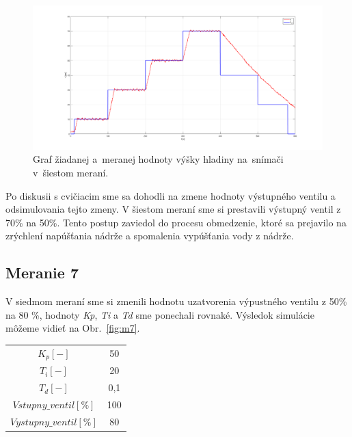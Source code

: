 \documentclass{article}
\begin{document}
\begin{figure}[!htbp]
	\begin{center}
		\includegraphics[width=\textwidth]{./include/meranie6.png}
	\end{center}
	\caption{Graf žiadanej a~meranej hodnoty výšky hladiny na~snímači v~šiestom meraní.}
	\label{fig:m6}
\end{figure}

Po diskusii s cvičiacim sme sa dohodli na zmene hodnoty výstupného ventilu a odsimulovania tejto zmeny.
V šiestom meraní sme si prestavili výstupný ventil z 70\% na 50\%. Tento postup zaviedol do procesu
obmedzenie, ktoré sa prejavilo na zrýchlení napúšťania nádrže a spomalenia vypúšťania vody z nádrže.

\clearpage

\subsection{Meranie 7}
\label{sec:meranie7}

V siedmom meraní sme si zmenili hodnotu uzatvorenia výpustného ventilu z 50\% na 80 \%, hodnoty
\textit{Kp}, \textit{Ti} a \textit{Td} sme ponechali rovnaké. Výsledok simulácie môžeme vidieť na Obr.~\ref{fig:m7}.

\begin{center}
\begin{tabular}{ |c|c| }
 \hline
 $K_p [-]$ & 50 \\
 $T_i [-]$ & 20 \\
 $T_d [-]$ & 0,1 \\
 \hline
 $Vstupny\_ventil[\%]$ & 100 \\
 $Vystupny\_ventil[\%]$ & 80 \\
 \hline
\end{tabular}
\end{center}
\end{document}
